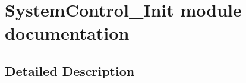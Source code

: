 \hypertarget{group___system_control___init__module}{}\section{System\+Control\+\_\+\+Init module documentation}
\label{group___system_control___init__module}


\subsection{Detailed Description}
